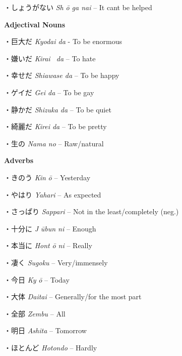 \par{・しょうがない \emph{Sh }\emph{ō ga nai }– It can\textquotesingle t be helped }
 
\par{\textbf{ Adjectival Nouns }}

\par{・巨大だ \emph{Kyodai da }- To be enormous }

\par{・嫌いだ \emph{Kirai  da }– To hate }

\par{・幸せだ \emph{Shiawase da }– To be happy }

\par{・ゲイだ \emph{Gei da }– To be gay }

\par{・静かだ \emph{Shizuka da }– To be quiet }

\par{・綺麗だ \emph{Kirei da }– To be pretty }

\par{・生の \emph{Nama no }– Raw\slash natural }

\par{\textbf{Adverbs }}

\par{・きのう \emph{Kin }\emph{ō }– Yesterday }

\par{・やはり \emph{Yahari }– As expected }

\par{・さっぱり \emph{Sappari }– Not in the least\slash completely (neg.) }

\par{・十分に \emph{J }\emph{ūbun ni }– Enough }

\par{・本当に \emph{Hont }\emph{ō ni }– Really }

\par{・凄く \emph{Sugoku }– Very\slash immensely }

\par{・今日 \emph{Ky }\emph{ō }– Today }

\par{・大体 \emph{Daitai }– Generally\slash for the most part }

\par{・全部 \emph{Zembu }– All }

\par{・明日 \emph{Ashita }– Tomorrow }

\par{・ほとんど \emph{Hotondo }– Hardly }

